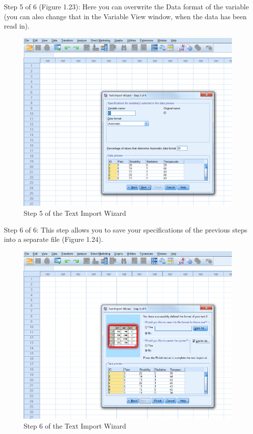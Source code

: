 \documentclass[]{book}
\theoremstyle{definition}
\theoremstyle{definition}
\theoremstyle{definition}
\theoremstyle{remark}
\begin{document}
Step 5 of 6 (Figure 1.23): Here you can overwrite the Data format of the
variable (you can also change that in the Variable View window, when the
data has been read in).

\begin{figure}

{\centering \includegraphics[width=0.9\linewidth]{images/fig1.23} 

}

\caption{Step 5 of the Text Import Wizard}\label{fig:fig23}
\end{figure}

Step 6 of 6: This step allows you to save your specifications of the
previous steps into a separate file (Figure 1.24).

\begin{figure}

{\centering \includegraphics[width=0.9\linewidth]{images/fig1.24} 

}

\caption{Step 6 of the Text Import Wizard}\label{fig:fig24}
\end{figure}
\end{document}
